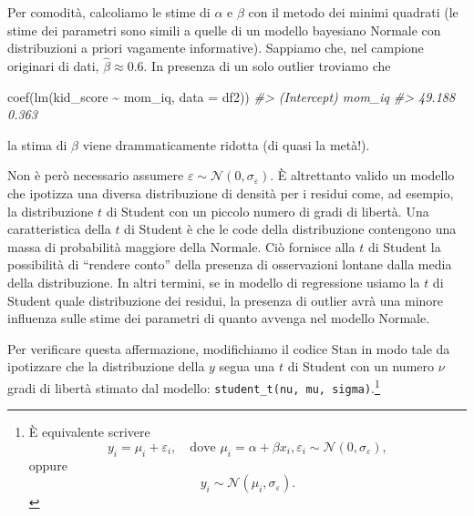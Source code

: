\documentclass[
  10pt,
  italian,
  a4paper,
  extrafontsizes,onecolumn,openright
  ]{memoir}
\newenvironment{Shaded}{\begin{snugshade}}{\end{snugshade}}
\newcommand{\AttributeTok}[1]{\textcolor[rgb]{0.77,0.63,0.00}{#1}}
\newcommand{\CommentTok}[1]{\textcolor[rgb]{0.56,0.35,0.01}{\textit{#1}}}
\newcommand{\FunctionTok}[1]{\textcolor[rgb]{0.00,0.00,0.00}{#1}}
\newcommand{\NormalTok}[1]{#1}
\newcommand{\SpecialCharTok}[1]{\textcolor[rgb]{0.00,0.00,0.00}{#1}}
\begin{document}
Per comodità, calcoliamo le stime di \(\alpha\) e \(\beta\) con il metodo dei minimi quadrati (le stime dei parametri sono simili a quelle di un modello bayesiano Normale con distribuzioni a priori vagamente informative). Sappiamo che, nel campione originari di dati, \(\hat{\beta} \approx 0.6\). In presenza di un solo outlier troviamo
che

\begin{Shaded}
\begin{Highlighting}[]
\FunctionTok{coef}\NormalTok{(}\FunctionTok{lm}\NormalTok{(kid\_score }\SpecialCharTok{\textasciitilde{}}\NormalTok{ mom\_iq, }\AttributeTok{data =}\NormalTok{ df2))}
\CommentTok{\#\textgreater{} (Intercept)      mom\_iq }
\CommentTok{\#\textgreater{}      49.188       0.363}
\end{Highlighting}
\end{Shaded}

\noindent
la stima di \(\beta\) viene drammaticamente ridotta (di quasi la metà!).

Non è però necessario assumere \(\varepsilon \sim \mathcal{N}(0, \sigma_{\varepsilon})\). È altrettanto valido un modello che ipotizza una diversa distribuzione di densità per i residui come, ad esempio, la distribuzione \(t\) di Student con un piccolo numero di gradi di libertà. Una caratteristica della \(t\) di Student è che le code della distribuzione contengono una massa di probabilità maggiore della Normale. Ciò fornisce alla \(t\) di Student la possibilità di ``rendere conto'' della presenza di osservazioni lontane dalla media della distribuzione. In altri termini, se in modello di regressione usiamo la \(t\) di Student quale distribuzione dei residui, la presenza di outlier avrà una minore influenza sulle stime dei parametri di quanto avvenga nel modello Normale.

Per verificare questa affermazione, modifichiamo il codice Stan in modo tale da ipotizzare che la distribuzione della \(y\) segua una \(t\) di Student con un numero \(\nu\) gradi di libertà stimato dal modello: \texttt{student\_t(nu,\ mu,\ sigma)}.\footnote{È equivalente scrivere
  \[
  y_i = \mu_i + \varepsilon_i, \quad \text{dove } \mu_i = \alpha + \beta x_i, \varepsilon_i \sim \mathcal{N}(0, \sigma_\varepsilon),
  \]
  oppure
  \[
  y_i \sim \mathcal{N}(\mu_i, \sigma_\varepsilon).
  \]}
\end{document}
